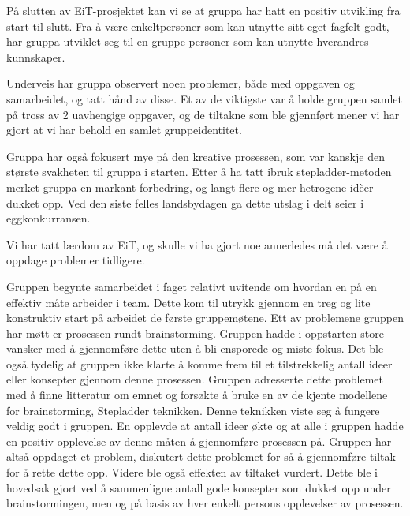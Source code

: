 


På slutten av EiT-prosjektet kan vi se at gruppa har hatt en positiv utvikling fra start til slutt.
Fra å være enkeltpersoner som kan utnytte sitt eget fagfelt godt,
har gruppa utviklet seg til en gruppe personer som kan utnytte hverandres kunnskaper.

Underveis har gruppa observert noen problemer, både med oppgaven og samarbeidet,
og tatt hånd av disse.
Et av de viktigste var å holde gruppen samlet på tross av 2 uavhengige oppgaver, 
og de tiltakne som ble gjennført mener vi har gjort at vi har behold en samlet gruppeidentitet.

Gruppa har også fokusert mye på den kreative prosessen, som var kanskje den største svakheten til gruppa i starten.
Etter å ha tatt ibruk stepladder-metoden merket gruppa en markant forbedring, 
og langt flere og mer hetrogene idèer dukket opp. 
Ved den siste felles landsbydagen ga dette utslag i delt seier i eggkonkurransen.

Vi har tatt lærdom av EiT, og skulle vi ha gjort noe annerledes må det være å oppdage problemer tidligere.


Gruppen begynte samarbeidet i faget relativt uvitende om hvordan en på en effektiv måte arbeider i team.
Dette kom til utrykk gjennom en treg og lite konstruktiv start på arbeidet de første gruppemøtene.
Ett av problemene gruppen har møtt er prosessen rundt brainstorming.
Gruppen hadde i oppstarten store vansker med å gjennomføre dette uten å bli ensporede og miste fokus.
Det ble også tydelig at gruppen ikke klarte å komme frem til et tilstrekkelig antall ideer eller konsepter gjennom denne prosessen.
Gruppen adresserte dette problemet med å finne litteratur om emnet og forsøkte å bruke en av de kjente modellene for brainstorming, Stepladder teknikken.
Denne teknikken viste seg å fungere veldig godt i gruppen.
En opplevde at antall ideer økte og at alle i gruppen hadde en positiv opplevelse av denne måten å gjennomføre prosessen på.
Gruppen har altså oppdaget et problem, diskutert dette problemet for så å gjennomføre tiltak for å rette dette opp.
Videre ble også effekten av tiltaket vurdert.
Dette ble i hovedsak gjort ved å sammenligne antall gode konsepter som dukket opp under brainstormingen, men og på basis av hver enkelt persons opplevelser av prosessen.

